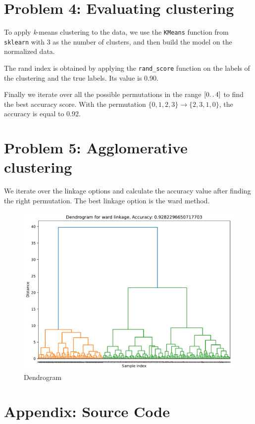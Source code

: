 \documentclass[a4paper]{article}
\begin{document}
\section*{Problem 4: Evaluating clustering}
To apply \textit{k}-means clustering to the data, we use the \verb|KMeans| function from \verb|sklearn| with 3 as the number of clusters, and then build the model on the normalized data.

The rand index is obtained by applying the \verb|rand_score| function on the labels of the clustering and the true labels. Its value is 0.90.

Finally we iterate over all the possible permutations in the range $ [0\ldotp\ldotp4] $ to find the best accuracy score. With the permutation $\{0, 1, 2, 3\} \rightarrow \{2, 3, 1, 0\}$, the accuracy is equal to 0.92.

\section*{Problem 5: Agglomerative clustering}
We iterate over the linkage options and calculate the accuracy value after finding the right permutation. The best linkage option is the ward method.

\begin{figure}[H]
  \begin{center}
    \includegraphics[width=\textwidth]{ola/dendrogram.pdf}
    \caption{Dendrogram}
    \label{fig:dendrogram}
  \end{center}
\end{figure}

\newpage


\printbibliography

\section*{Appendix: Source Code}




\end{document}
